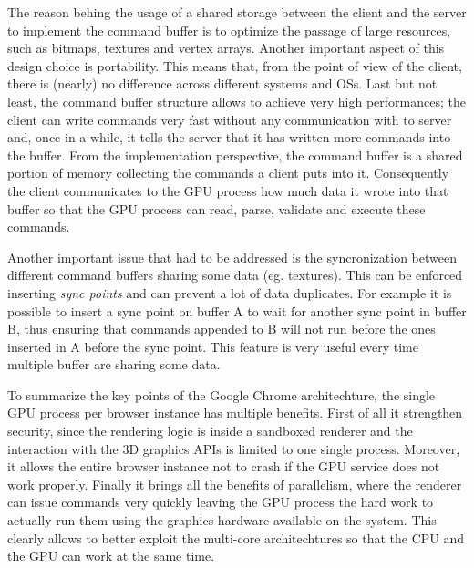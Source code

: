 The reason behing the usage of a shared storage between the client and the server to implement
the command buffer is to optimize the passage of large resources, such as bitmaps,
textures and vertex arrays. Another important aspect of this design choice is
portability. This means that, from the point of view of the client, there is (nearly) no
difference across different systems and OSs. Last but not least, the command buffer
structure allows to achieve very high performances; the client can write commands
very fast without any communication with to server and, once in a while,
it tells the server that it has written more commands into the buffer.
From the implementation perspective, the command buffer is a shared portion of
memory collecting the commands a client puts into it. Consequently the client
communicates to the GPU process how much data it wrote into that buffer so that
the GPU process can read, parse, validate and execute these commands.

Another important issue that had to be addressed is the syncronization between different
command buffers sharing some data (eg. textures). This can be enforced inserting
\emph{sync points} and can prevent a lot of data duplicates.
For example it is possible to insert a sync point on buffer A
to wait for another sync point in buffer B, thus ensuring that commands appended to
B will not run before the ones inserted in A before the sync point. This feature
is very useful every time multiple buffer are sharing some data.

To summarize the key points of the Google Chrome architechture, the single GPU
process per browser instance has multiple benefits. First of all it strengthen
security, since the rendering logic is inside a sandboxed renderer and the interaction
with the 3D graphics APIs is limited to one single process. Moreover, it allows
the entire browser instance not to crash if the GPU service does not work properly.
Finally it brings all the benefits of parallelism, where the renderer can issue
commands very quickly leaving the GPU process the hard work to actually run them
using the graphics hardware available on the system. This clearly allows to better
exploit the multi-core architechtures so that the CPU and the GPU can work at the
same time.
